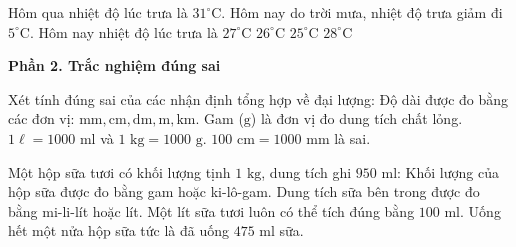 \begin{ex} %
Hôm qua nhiệt độ lúc trưa là $31^\circ\text{C}$. Hôm nay do trời mưa, nhiệt độ trưa giảm đi $5^\circ\text{C}$. Hôm nay nhiệt độ lúc trưa là
\choice
{$27^\circ\text{C}$}
{\True $26^\circ\text{C}$}
{$25^\circ\text{C}$}
{$28^\circ\text{C}$}
\end{ex}

\textbf{Phần 2. Trắc nghiệm đúng sai}

\begin{ex} %
Xét tính đúng sai của các nhận định tổng hợp về đại lượng:
\choiceTF
{\True Độ dài được đo bằng các đơn vị: $\text{mm}, \text{cm}, \text{dm}, \text{m}, \text{km}$.}
{Gam ($\text{g}$) là đơn vị đo dung tích chất lỏng.}
{\True $1\ell = 1000\text{ ml}$ và $1\text{ kg} = 1000\text{ g}$.}
{$100\text{ cm} = 1000\text{ mm}$ là sai.}
\end{ex}

\begin{ex} %
Một hộp sữa tươi có khối lượng tịnh $1\text{ kg}$, dung tích ghi $950\text{ ml}$:
\choiceTF
{\True Khối lượng của hộp sữa được đo bằng gam hoặc ki-lô-gam.}
{\True Dung tích sữa bên trong được đo bằng mi-li-lít hoặc lít.}
{Một lít sữa tươi luôn có thể tích đúng bằng $100\text{ ml}$.}
{\True Uống hết một nửa hộp sữa tức là đã uống $475\text{ ml}$ sữa.}
\end{ex}

